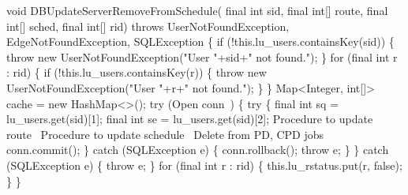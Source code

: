 void DBUpdateServerRemoveFromSchedule(
    final int sid, final int[] route, final int[] sched, final int[] rid)
throws UserNotFoundException, EdgeNotFoundException, SQLException \{
  if (!this.lu_users.containsKey(sid)) \{
    throw new UserNotFoundException("User "+sid+" not found.");
  \}
  for (final int r : rid) \{
    if (!this.lu_users.containsKey(r)) \{
      throw new UserNotFoundException("User "+r+" not found.");
    \}
  \}
  Map<Integer, int[]> cache = new HashMap<>();
  try (\LA{}Open \code{}conn\edoc{}~{\nwtagstyle{}}\RA{}) \{
    try \{
      final int sq = lu_users.get(sid)[1];
      final int se = lu_users.get(sid)[2];
      \LA{}Procedure to update route~{\nwtagstyle{}}\RA{}
      \LA{}Procedure to update schedule~{\nwtagstyle{}}\RA{}
      \LA{}Delete from PD, CPD jobs~{\nwtagstyle{}}\RA{}
      conn.commit();
    \} catch (SQLException e) \{
      conn.rollback();
      throw e;
    \}
  \} catch (SQLException e) \{
    throw e;
  \}
\eatline
{}\nwendcode{}
\nwenddocs{}\plusendmoddef
  for (final int r : rid) \{
    this.lu_rstatus.put(r, false);
  \}
\}
\nwendcode{}

